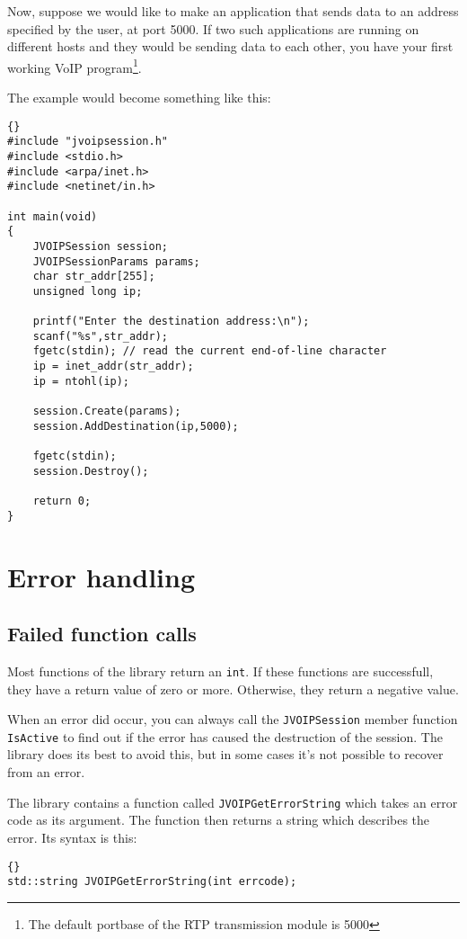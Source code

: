 	Now, suppose we would like to make an application that sends data to
	an address specified by the user, at port 5000. If two such applications
	are running on different hosts and they would be sending data to each
	other, you have your first working VoIP program\footnote{The default
	portbase of the RTP transmission module is 5000}.
	
	The example would become something like this:
	\begin{lstlisting}[frame=tb]{}
#include "jvoipsession.h"
#include <stdio.h>
#include <arpa/inet.h>
#include <netinet/in.h>

int main(void)
{
	JVOIPSession session;
	JVOIPSessionParams params;
	char str_addr[255];
	unsigned long ip;

	printf("Enter the destination address:\n");
	scanf("%s",str_addr);
	fgetc(stdin); // read the current end-of-line character
	ip = inet_addr(str_addr);
	ip = ntohl(ip);

	session.Create(params);
	session.AddDestination(ip,5000);

	fgetc(stdin);
	session.Destroy();

	return 0;
}

	\end{lstlisting}
	
	\section{Error handling}
	
		\subsection{Failed function calls}
		
		Most functions of the library return an {\tt int}. If these functions
		are successfull, they have a return value of zero or more. Otherwise,
		they return a negative value. 
		
		When an error did occur, you can always call the {\tt JVOIP\-Session} 
		member function {\tt IsActive} to find out if the error has caused the destruction 
		of the session. The library does its best to avoid this, but in some
		cases it's not possible to recover from an error.
		
		The library contains a function called {\tt JVOIP\-Get\-Error\-String}
		which takes an error code as its argument. The function then returns
		a string which describes the error. Its syntax is this:
		\begin{lstlisting}[frame=tb]{}
std::string JVOIPGetErrorString(int errcode);
		\end{lstlisting}
		
